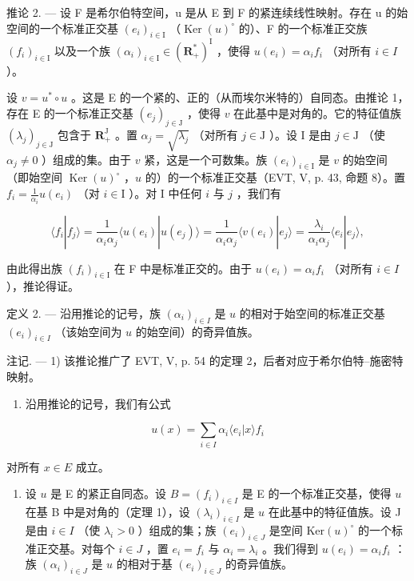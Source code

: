 推论 2. --- 设 F 是希尔伯特空间，u 是从 E 到 F 的紧连续线性映射。存在 u 的始空间的一个标准正交基 \((e_{i})_{i\in\mathrm{I}}\) （\(\operatorname{Ker}(u)^{\circ}\) 的）、F 的一个标准正交族 \((f_{i})_{i\in\mathrm{I}}\) 以及一个族 \((\alpha_{i})_{i\in\mathrm{I}}\in(\mathbf{R}_{+}^{*})^{\mathrm{I}}\) ，使得 \(u(e_{i})=\alpha_{i}f_{i}\) （对所有 \(i\in I\) ）。

设 \(v = u^{*} \circ u\) 。这是 E 的一个紧的、正的（从而埃尔米特的）自同态。由推论 1，存在 E 的一个标准正交基 \((e_{j})_{j \in \mathrm{J}}\) ，使得 \(v\) 在此基中是对角的。它的特征值族 \((\lambda_{j})_{j \in \mathrm{J}}\) 包含于 \(\mathbf{R}_{+}^{\mathrm{J}}\) 。置 \(\alpha_{j} = \sqrt{\lambda_{j}}\) （对所有 \(j \in \mathrm{J}\) ）。设 I 是由 \(j \in \mathrm{J}\) （使 \(\alpha_{j} \neq 0\) ）组成的集。由于 \(v\) 紧，这是一个可数集。族 \((e_{i})_{i \in \mathrm{I}}\) 是 \(v\) 的始空间（即始空间 \(\operatorname{Ker}(u)^{\circ}\) ，\(u\) 的）的一个标准正交基（EVT, V, p. 43, 命题 8）。置 \(f_{i} = \frac{1}{\alpha_{i}} u(e_{i})\) （对 \(i\in \mathrm{I}\) ）。对 I 中任何 \(i\) 与 \(j\) ，我们有

\[
\langle f _ {i} | f _ {j} \rangle = \frac {1}{\alpha_ {i} \alpha_ {j}} \langle u (e _ {i}) | u (e _ {j}) \rangle = \frac {1}{\alpha_ {i} \alpha_ {j}} \langle v (e _ {i}) | e _ {j} \rangle = \frac {\lambda_ {i}}{\alpha_ {i} \alpha_ {j}} \langle e _ {i} | e _ {j} \rangle ,
\]

由此得出族 \((f_{i})_{i\in\mathrm{I}}\) 在 F 中是标准正交的。由于 \(u(e_{i})=\alpha_{i}f_{i}\) （对所有 \(i\in I\) ），推论得证。

定义 2. --- 沿用推论的记号，族 \((\alpha_{i})_{i\in I}\) 是 \(u\) 的相对于始空间的标准正交基 \((e_{i})_{i\in I}\) （该始空间为 \(u\) 的始空间）的奇异值族。

注记. --- 1) 该推论推广了 EVT, V, p. 54 的定理 2，后者对应于希尔伯特–施密特映射。

\begin{enumerate}
\def\labelenumi{\arabic{enumi})}
\setcounter{enumi}{1}
\tightlist
\item
  沿用推论的记号，我们有公式
\end{enumerate}

\[
u (x) = \sum_ {i \in I} \alpha_ {i} \langle e _ {i} | x \rangle f _ {i}\tag{1}
\]

对所有 \(x \in E\) 成立。

\begin{enumerate}
\def\labelenumi{\arabic{enumi})}
\setcounter{enumi}{2}
\tightlist
\item
  设 \(u\) 是 E 的紧正自同态。设 \(B = (f_i)_{i \in I}\) 是 E 的一个标准正交基，使得 \(u\) 在基 B 中是对角的（定理 1），设 \((\lambda_i)_{i \in I}\) 是 \(u\) 在此基中的特征值族。设 J 是由 \(i \in I\) （使 \(\lambda_i > 0\) ）组成的集；族 \((e_i)_{i \in J}\) 是空间 \(\text{Ker}(u)^{\circ}\) 的一个标准正交基。对每个 \(i \in J\) ，置 \(e_i = f_i\) 与 \(\alpha_i = \lambda_i\) 。我们得到 \(u(e_i) = \alpha_if_i\) ：族 \((\alpha_i)_{i \in J}\) 是 \(u\) 的相对于基 \((e_i)_{i \in J}\) 的奇异值族。
\end{enumerate}

